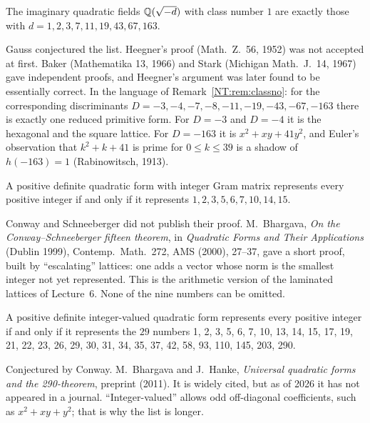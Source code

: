 \begin{theorem}\label{NT:gal:classno}
The imaginary quadratic fields $\mathbb{Q}(\sqrt{-d})$ with class number $1$ are exactly those with
$d=1,2,3,7,11,19,43,67,163$.
\end{theorem}
Gauss conjectured the list. Heegner's proof (Math.\ Z.\ 56, 1952) was not accepted at first. Baker
(Mathematika 13, 1966) and Stark (Michigan Math.\ J.\ 14, 1967) gave independent proofs, and Heegner's
argument was later found to be essentially correct. In the language of Remark~\ref{NT:rem:classno}: for the
corresponding discriminants $D=-3,-4,-7,-8,-11,-19,-43,-67,-163$ there is exactly one reduced primitive form.
For $D=-3$ and $D=-4$ it is the hexagonal and the square lattice. For $D=-163$ it is $x^2+xy+41y^2$, and
Euler's observation that $k^2+k+41$ is prime for $0\le k\le39$ is a shadow of $h(-163)=1$ (Rabinowitsch, 1913).

\begin{theorem}\label{NT:gal:15}
A positive definite quadratic form with integer Gram matrix represents every positive integer if and only if it
represents $1,2,3,5,6,7,10,14,15$.
\end{theorem}
Conway and Schneeberger did not publish their proof. M.~Bhargava, \emph{On the Conway--Schneeberger
fifteen theorem}, in \emph{Quadratic Forms and Their Applications} (Dublin 1999), Contemp.\ Math.\ 272,
AMS (2000), 27--37, gave a short proof, built by ``escalating'' lattices: one adds a vector whose
norm is the smallest integer not yet represented. This is the arithmetic version of the laminated
lattices of Lecture~6. None of the nine numbers can be omitted.

\begin{theorem}\label{NT:gal:290}
A positive definite integer-valued quadratic form represents every positive integer if and only if it
represents
the $29$ numbers 1, 2, 3, 5, 6, 7, 10, 13, 14, 15, 17, 19, 21, 22, 23, 26, 29, 30, 31, 34, 35, 37, 42, 58, 93,
110, 145, 203, 290.
\end{theorem}
Conjectured by Conway. M.~Bhargava and J.~Hanke, \emph{Universal quadratic forms and the 290-theorem},
preprint (2011). It is widely cited, but as of 2026 it has not appeared in a journal.
``Integer-valued'' allows odd off-diagonal coefficients, such as $x^2+xy+y^2$; that is why the list is longer.

